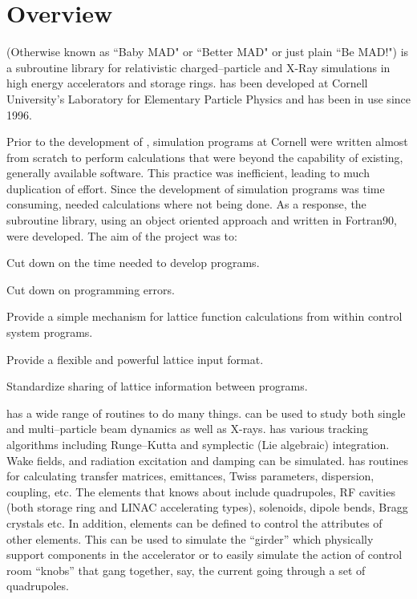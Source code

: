 \section*{Overview}

\bmad (Otherwise known as ``Baby MAD" or ``Better MAD" or just plain
``Be MAD!") is a subroutine library for relativistic
charged--particle and X-Ray simulations in high energy accelerators and
storage rings. \bmad has been developed at Cornell University's
Laboratory for Elementary Particle Physics and has been in use since
1996.

Prior to the development of \bmad, simulation programs at Cornell were
written almost from scratch to perform calculations that were beyond
the capability of existing, generally available software. This
practice was inefficient, leading to much duplication of effort.
Since the development of simulation programs was time consuming,
needed calculations where not being done.  
As a response, the \bmad subroutine library, using an
object oriented approach and written in Fortran90, were developed.
The aim of the \bmad project was to:
\begin{Itemize}
\item Cut down on the time needed to develop programs.
\item Cut down on programming errors.
\item Provide a simple mechanism for lattice function calculations
from within control system programs.
\item Provide a flexible and powerful lattice input format.
\item Standardize sharing of lattice information between 
programs.
\end{Itemize}

\bmad has a wide range of routines to do many things.  \bmad can be
used to study both single and multi--particle beam dynamics as well
as X-rays. \bmad has various
tracking algorithms including Runge--Kutta and symplectic (Lie
algebraic) integration.  Wake fields, and radiation excitation and
damping can be simulated. \bmad has routines for calculating transfer
matrices, emittances, Twiss parameters, dispersion, coupling, etc. The
elements that \bmad knows about include quadrupoles, RF cavities (both
storage ring and LINAC accelerating types), solenoids, dipole bends,
Bragg crystals etc. 
In addition, elements can be defined to control the attributes of
other elements. This can be used to simulate the ``girder'' which
physically support components in the accelerator or to easily simulate
the action of control room ``knobs'' that gang together, say, the
current going through a set of quadrupoles.

